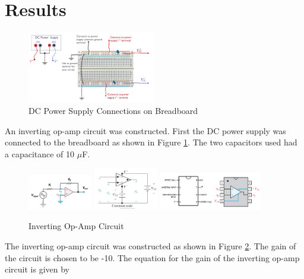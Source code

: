\documentclass[12pt]{article}
\begin{document}
\section{Results}
\begin{figure}[H]
	\centering
	\includegraphics[width=0.5\textwidth]{powersuply connections.png}
	\caption{DC Power Supply Connections on Breadboard}
	\label{fig:fig1}
\end{figure}
An inverting op-amp circuit was constructed. First the DC power supply 
was connected to the breadboard as shown in Figure \ref{fig:fig1}. The 
two capacitors used had a capacitance of 10 $\mu$F.


\begin{figure}[H]
	\centering
	\includegraphics[width=0.25\textwidth]{inverting op-amp circuit.png}\hfill
	\includegraphics[width=0.25\textwidth]{dc power to op amp.png}\hfill
	\includegraphics[width=0.4\textwidth]{op amp dip.png}
	\caption{Inverting Op-Amp Circuit}
	\label{fig:fig2}
\end{figure}

The inverting op-amp circuit was constructed as shown in Figure 
\ref{fig:fig2}. The gain of the circuit is chosen to be -10. The
equation for the gain of the inverting op-amp circuit is given by
\end{document}
